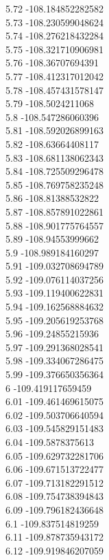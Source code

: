 {5.72	-108.184852282582\\
5.73	-108.230599048624\\
5.74	-108.276218432284\\
5.75	-108.321710906981\\
5.76	-108.36707694391\\
5.77	-108.412317012042\\
5.78	-108.457431578147\\
5.79	-108.5024211068\\
5.8	-108.547286060396\\
5.81	-108.592026899163\\
5.82	-108.63664408117\\
5.83	-108.681138062343\\
5.84	-108.725509296478\\
5.85	-108.769758235248\\
5.86	-108.81388532822\\
5.87	-108.857891022861\\
5.88	-108.901775764557\\
5.89	-108.94553999662\\
5.9	-108.989184160297\\
5.91	-109.032708694789\\
5.92	-109.076114037256\\
5.93	-109.119400622831\\
5.94	-109.162568884632\\
5.95	-109.205619253768\\
5.96	-109.24855215936\\
5.97	-109.291368028541\\
5.98	-109.334067286475\\
5.99	-109.376650356364\\
6	-109.419117659459\\
6.01	-109.461469615075\\
6.02	-109.503706640594\\
6.03	-109.545829151483\\
6.04	-109.5878375613\\
6.05	-109.629732281706\\
6.06	-109.671513722477\\
6.07	-109.713182291512\\
6.08	-109.754738394843\\
6.09	-109.796182436648\\
6.1	-109.837514819259\\
6.11	-109.878735943172\\
6.12	-109.919846207059\\
}
